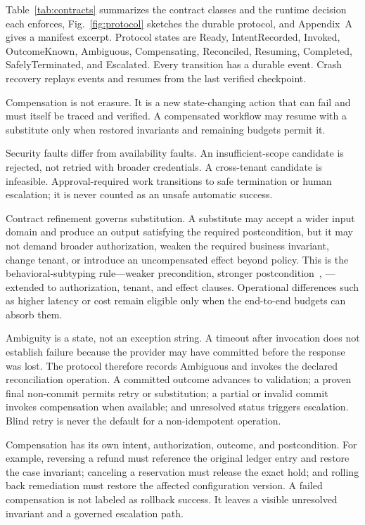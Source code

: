 \documentclass[10pt,journal,compsoc]{IEEEtran}
\begin{document}
Table~\ref{tab:contracts} summarizes the contract classes and the runtime decision each enforces, Fig.~\ref{fig:protocol} sketches the durable protocol, and Appendix~A gives a manifest excerpt. Protocol states are Ready, IntentRecorded, Invoked, OutcomeKnown, Ambiguous, Compensating, Reconciled, Resuming, Completed, SafelyTerminated, and Escalated. Every transition has a durable event. Crash recovery replays events and resumes from the last verified checkpoint.

Compensation is not erasure. It is a new state-changing action that can fail and must itself be traced and verified. A compensated workflow may resume with a substitute only when restored invariants and remaining budgets permit it.

Security faults differ from availability faults. An insufficient-scope candidate is rejected, not retried with broader credentials. A cross-tenant candidate is infeasible. Approval-required work transitions to safe termination or human escalation; it is never counted as an unsafe automatic success.

Contract refinement governs substitution. A substitute may accept a wider input domain and produce an output satisfying the required postcondition, but it may not demand broader authorization, weaken the required business invariant, change tenant, or introduce an uncompensated effect beyond policy. This is the behavioral-subtyping rule---weaker precondition, stronger postcondition~\cite{meyer1992dbc}, \cite{liskov1994subtyping}---extended to authorization, tenant, and effect clauses. Operational differences such as higher latency or cost remain eligible only when the end-to-end budgets can absorb them.

Ambiguity is a state, not an exception string. A timeout after invocation does not establish failure because the provider may have committed before the response was lost. The protocol therefore records Ambiguous and invokes the declared reconciliation operation. A committed outcome advances to validation; a proven final non-commit permits retry or substitution; a partial or invalid commit invokes compensation when available; and unresolved status triggers escalation. Blind retry is never the default for a non-idempotent operation.

Compensation has its own intent, authorization, outcome, and postcondition. For example, reversing a refund must reference the original ledger entry and restore the case invariant; canceling a reservation must release the exact hold; and rolling back remediation must restore the affected configuration version. A failed compensation is not labeled as rollback success. It leaves a visible unresolved invariant and a governed escalation path.
\end{document}
